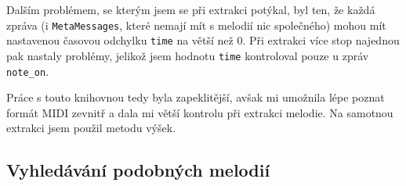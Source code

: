Dalším problémem, se kterým jsem se při extrakci potýkal, byl ten, že každá zpráva (i \lstinline{MetaMessages}, které nemají mít s melodií nic společného) mohou mít nastavenou časovou odchylku \lstinline{time} na větší než 0. Při extrakci více stop najednou pak nastaly problémy, jelikož jsem hodnotu \lstinline{time} kontroloval pouze u zpráv \lstinline{note_on}.

Práce s touto knihovnou tedy byla zapeklitější, avšak mi umožnila lépe poznat formát MIDI zevnitř a dala mi větší kontrolu při extrakci melodie. Na samotnou extrakci jsem použil metodu výšek.


\subsection{Vyhledávání podobných melodií}